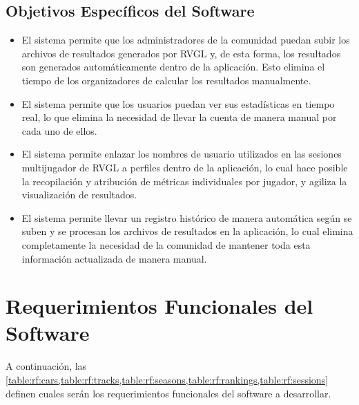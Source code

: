 \subsection{Objetivos Específicos del Software}
\begin{itemize}
	\item El sistema permite que los administradores de la comunidad puedan subir los archivos de resultados generados por RVGL y, de esta forma, los resultados son generados automáticamente dentro de la aplicación. Esto elimina el tiempo de los organizadores de calcular los resultados manualmente.
	\item El sistema permite que los usuarios puedan ver sus estadísticas en tiempo real, lo que elimina la necesidad de llevar la cuenta de manera manual por cada uno de ellos.
	\item El sistema permite enlazar los nombres de usuario utilizados en las sesiones multijugador de RVGL a perfiles dentro de la aplicación, lo cual hace posible la recopilación y atribución de métricas individuales por jugador, y agiliza la visualización de resultados.
	\item El sistema permite llevar un registro histórico de manera automática según se suben y se procesan los archivos de resultados en la aplicación, lo cual elimina completamente la necesidad de la comunidad de mantener toda esta información actualizada de manera manual.
\end{itemize}

\section{Requerimientos Funcionales del Software}
A continuación, las \cref{table:rf:cars,table:rf:tracks,table:rf:seasons,table:rf:rankings,table:rf:sessions} definen cuales serán los requerimientos funcionales del software a desarrollar.

